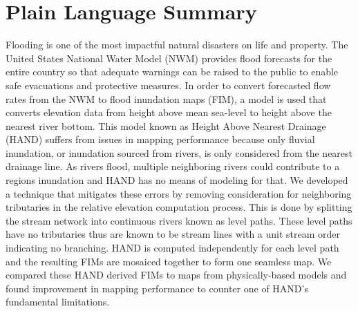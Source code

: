 \documentclass[draft]{dependencies/agujournal2019}
\begin{document}
\section*{Plain Language Summary}
Flooding is one of the most impactful natural disasters on life and property.
The United States National Water Model (NWM) provides flood forecasts for the entire country so that adequate warnings can be raised to the public to enable safe evacuations and protective measures.
In order to convert forecasted flow rates from the NWM to flood inundation maps (FIM), a model is used that converts elevation data from height above mean sea-level to height above the nearest river bottom.
This model known as Height Above Nearest Drainage (HAND) suffers from issues in mapping performance because only fluvial inundation, or inundation sourced from rivers, is only considered from the nearest drainage line.
As rivers flood, multiple neighboring rivers could contribute to a regions inundation and HAND has no means of modeling for that.
We developed a technique that mitigates these errors by removing consideration for neighboring tributaries in the relative elevation computation process.
This is done by splitting the stream network into continuous rivers known as level paths.
These level paths have no tributaries thus are known to be stream lines with a unit stream order indicating no branching.
HAND is computed independently for each level path and the resulting FIMs are mosaiced together to form one seamless map.
We compared these HAND derived FIMs to maps from physically-based models and found improvement in mapping performance to counter one of HAND's fundamental limitations.
%
 

%

\end{document}

